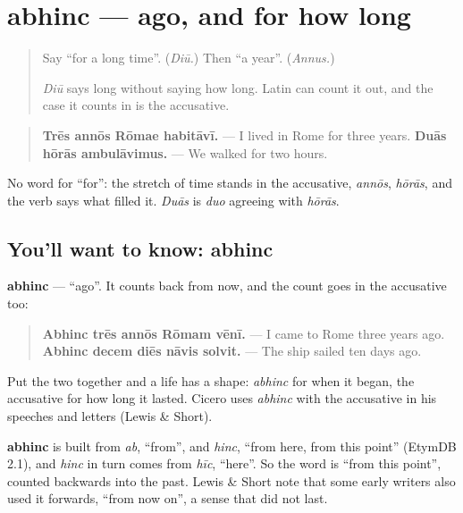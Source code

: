 \section[abhinc]{abhinc — ago, and for how long}

\label{lesson:LA-C288-abhinc}



\begin{quote}
Say \textquotedblleft{}for a long time\textquotedblright{}. (\emph{Diū.}) Then \textquotedblleft{}a year\textquotedblright{}. (\emph{Annus.})

\emph{Diū} says long without saying how long. Latin can count it out, and the case it counts in is the accusative.
\end{quote}

\begin{grammarlens}[title={Grammar Lens: the accusative of how long}]
\begin{quote}
\textbf{Trēs annōs Rōmae habitāvī.} — I lived in Rome for three years. \textbf{Duās hōrās ambulāvimus.} — We walked for two hours.
\end{quote}

No word for \textquotedblleft{}for\textquotedblright{}: the stretch of time stands in the accusative, \emph{annōs}, \emph{hōrās}, and the verb says what filled it. \emph{Duās} is \emph{duo} agreeing with \emph{hōrās}.
\end{grammarlens}

\subsection*{You'll want to know: abhinc}
\textbf{abhinc} — \textquotedblleft{}ago\textquotedblright{}. It counts back from now, and the count goes in the accusative too:

\begin{quote}
\textbf{Abhinc trēs annōs Rōmam vēnī.} — I came to Rome three years ago. \textbf{Abhinc decem diēs nāvis solvit.} — The ship sailed ten days ago.
\end{quote}

Put the two together and a life has a shape: \emph{abhinc} for when it began, the accusative for how long it lasted. Cicero uses \emph{abhinc} with the accusative in his speeches and letters (Lewis \& Short).

\begin{cousinweb}
\textbf{abhinc} is built from \emph{ab}, \textquotedblleft{}from\textquotedblright{}, and \emph{hinc}, \textquotedblleft{}from here, from this point\textquotedblright{} (EtymDB 2.1), and \emph{hinc} in turn comes from \emph{hīc}, \textquotedblleft{}here\textquotedblright{}. So the word is \textquotedblleft{}from this point\textquotedblright{}, counted backwards into the past. Lewis \& Short note that some early writers also used it forwards, \textquotedblleft{}from now on\textquotedblright{}, a sense that did not last.
\end{cousinweb}

